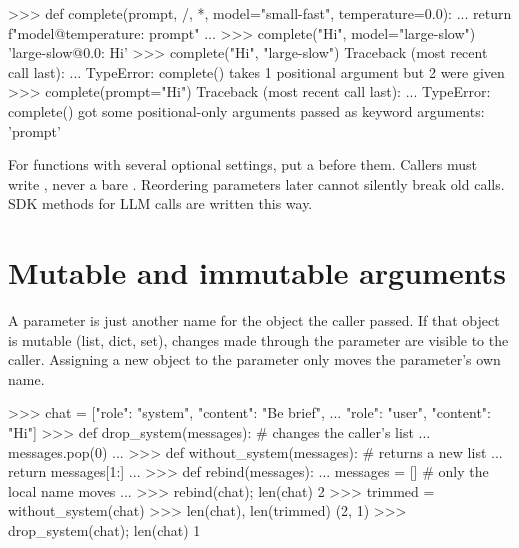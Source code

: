 \begin{pycode}
>>> def complete(prompt, /, *, model="small-fast", temperature=0.0):
...     return f"{model}@{temperature}: {prompt}"
...
>>> complete("Hi", model="large-slow")
'large-slow@0.0: Hi'
>>> complete("Hi", "large-slow")
Traceback (most recent call last):
  ...
TypeError: complete() takes 1 positional argument but 2 were given
>>> complete(prompt="Hi")
Traceback (most recent call last):
  ...
TypeError: complete() got some positional-only arguments passed as
keyword arguments: 'prompt'
\end{pycode}

\begin{gamerule}
For functions with several optional settings, put a \code{*} before them. Callers must write
, never a bare . Reordering parameters later cannot silently break
old calls. SDK methods for LLM calls are written this way.
\end{gamerule}

\section{Mutable and immutable arguments}

A parameter is just another name for the object the caller passed. If that object is mutable
(list, dict, set), changes made through the parameter are visible to the caller. Assigning a
new object to the parameter only moves the parameter's own name.

\begin{center}
\end{center}

\begin{pycode}
>>> chat = [{"role": "system", "content": "Be brief"},
...         {"role": "user", "content": "Hi"}]
>>> def drop_system(messages):          # changes the caller's list
...     messages.pop(0)
...
>>> def without_system(messages):       # returns a new list
...     return messages[1:]
...
>>> def rebind(messages):
...     messages = []                   # only the local name moves
...
>>> rebind(chat); len(chat)
2
>>> trimmed = without_system(chat)
>>> len(chat), len(trimmed)
(2, 1)
>>> drop_system(chat); len(chat)
1
\end{pycode}

